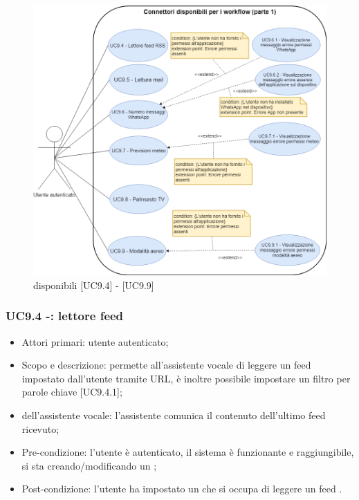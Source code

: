 \begin{figure}[H]
	\centering
	\includegraphics[width=15cm,keepaspectratio]{../includes/pics/wf1.png}
	\caption{\label{fig:mission} disponibili [UC9.4] - [UC9.9]}
\end{figure}

\subsubsection{UC9.4 -: lettore feed }
\begin{itemize}
	\item  Attori primari: utente autenticato;
	\item  Scopo e descrizione: permette all'assistente vocale di leggere un feed  impostato dall'utente tramite URL, è inoltre possibile impostare un filtro per parole chiave [UC9.4.1];
	\item  {} dell'assistente vocale: l'assistente comunica il contenuto dell'ultimo feed  ricevuto;
	\item  Pre-condizione: l'utente è autenticato, il sistema è funzionante e raggiungibile, si sta creando/modificando un ;
	\item  Post-condizione: l'utente ha impostato un  che si occupa di leggere un feed .
\end{itemize}
